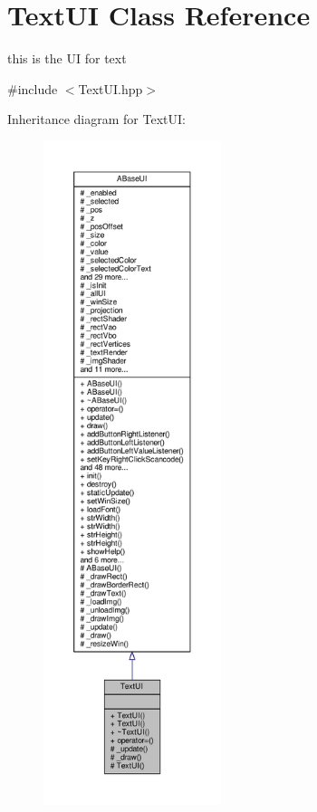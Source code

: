 \hypertarget{class_text_u_i}{}\section{Text\+UI Class Reference}
\label{class_text_u_i}


this is the UI for text  




{\ttfamily \#include $<$Text\+U\+I.\+hpp$>$}



Inheritance diagram for Text\+UI\+:
\nopagebreak
\begin{figure}[H]
\begin{center}
\leavevmode
\includegraphics[height=550pt]{class_text_u_i__inherit__graph}
\end{center}
\end{figure}


